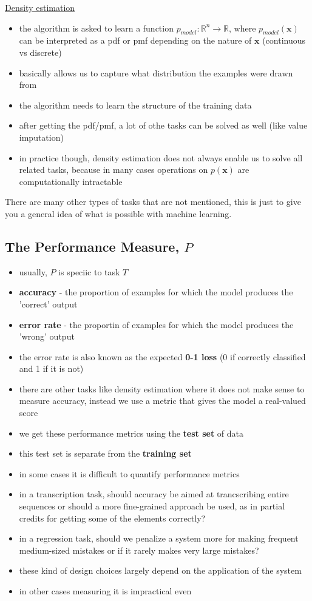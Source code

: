 \documentclass[11pt, twocolumn]{report}
\def\realnumbers{\mathbb{R}}
\begin{document}
\underline{Density estimation}
\begin{itemize}
  \item the algorithm is asked to learn a function $p_{model} : \realnumbers^n
    \to \realnumbers$, where $p_{model}(\bm{x})$ can be interpreted as a pdf or
    pmf depending on the nature of $\bm{x}$ (continuous vs discrete)
  \item basically allows us to capture what distribution the examples were
    drawn from
  \item the algorithm needs to learn the structure of the training data
  \item after getting the pdf/pmf, a lot of othe tasks can be solved as well
    (like value imputation)
  \item in practice though, density estimation does not always enable us to
    solve all related tasks, because in many cases operations on $p(\bm{x})$
    are computationally intractable
\end{itemize}

There are many other types of tasks that are not mentioned, this is just to
give you a general idea of what is possible with machine learning.

\subsection{The Performance Measure, $P$}
\begin{itemize}
  \item usually, $P$ is speciic to task $T$
  \item \textbf{accuracy} - the proportion of examples for which the model
    produces the 'correct' output
  \item \textbf{error rate} - the proportin of examples for which the model
    produces the 'wrong' output
  \item the error rate is also known as the expected \textbf{0-1 loss} (0 if
    correctly classified and 1 if it is not)
  \item there are other tasks like density estimation where it does not make
    sense to measure accuracy, instead we use a metric that gives the model a
    real-valued score
  \item we get these performance metrics using the \textbf{test set} of data
  \item this test set is separate from the \textbf{training set}
  \item in some cases it is difficult to quantify performance metrics
  \item in a transcription task, should accuracy be aimed at trancscribing
    entire sequences or should a more fine-grained approach be used, as in
    partial credits for getting some of the elements correctly?
  \item in a regression task, should we penalize a system more for making
    frequent medium-sized mistakes or if it rarely makes very large mistakes?
  \item these kind of design choices largely depend on the application of the
    system
  \item in other cases measuring it is impractical even
\end{itemize}
\end{document}
